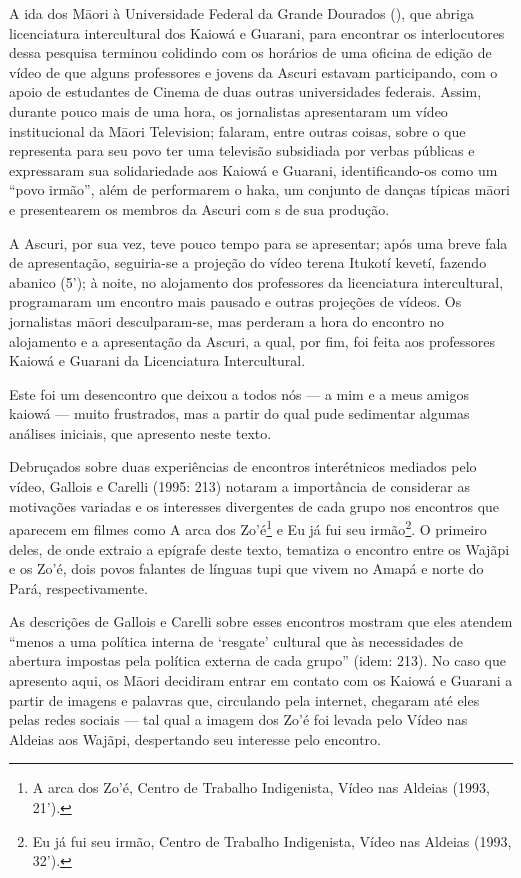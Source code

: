 A ida dos M\=aori à Universidade Federal da Grande Dourados (), que
abriga licenciatura intercultural dos Kaiowá e Guarani, para encontrar
os interlocutores dessa pesquisa terminou colidindo com os horários de
uma oficina de edição de vídeo de que alguns professores e jovens da
Ascuri estavam participando, com o apoio de estudantes de Cinema de
duas outras universidades federais. Assim, durante pouco mais de uma
hora, os jornalistas apresentaram um vídeo institucional da M\=aori
Television; falaram, entre outras coisas, sobre o que representa para
seu povo ter uma televisão subsidiada por verbas públicas e expressaram
sua solidariedade aos Kaiowá e Guarani, identificando-os como um ``povo
irmão'', além de performarem o haka, um conjunto de danças típicas
m\=aori e presentearem os membros da Ascuri com s de sua produção. 

A Ascuri, por sua vez, teve pouco tempo para se apresentar; após uma
breve fala de apresentação, seguiria-se a projeção do vídeo terena
Itukotí kevetí, fazendo abanico (5’); à noite, no alojamento dos
professores da licenciatura intercultural, programaram um encontro mais
pausado e outras projeções de vídeos. Os jornalistas m\=aori
desculparam-se, mas perderam a hora do encontro no alojamento e a
apresentação da Ascuri, a qual, por fim, foi feita aos professores
Kaiowá e Guarani da Licenciatura Intercultural. 

Este foi um desencontro que deixou a todos nós — a mim e a meus amigos
kaiowá — muito frustrados, mas a partir do qual pude sedimentar algumas
análises iniciais, que apresento neste texto. 

Debruçados sobre duas experiências de encontros interétnicos mediados
pelo vídeo, Gallois e Carelli (1995: 213) notaram a importância de
considerar as motivações variadas e os interesses divergentes de cada
grupo nos encontros que aparecem em filmes como A arca dos
Zo’é\footnote{A arca dos Zo’é, Centro de Trabalho Indigenista, Vídeo
nas Aldeias (1993, 21’).} e Eu já fui seu irmão\footnote{Eu já fui seu
irmão, Centro de Trabalho Indigenista, Vídeo nas Aldeias (1993, 32’).}.
O primeiro deles, de onde extraio a epígrafe deste texto, tematiza o
encontro entre os Wajãpi e os Zo’é, dois povos falantes de línguas tupi
que vivem no Amapá e norte do Pará, respectivamente.

As descrições de Gallois e Carelli sobre esses encontros mostram que
eles atendem ``menos a uma política interna de ‘resgate’ cultural que às
necessidades de abertura impostas pela política externa de cada grupo''
(idem: 213). No caso que apresento aqui, os M\=aori decidiram entrar em
contato com os Kaiowá e Guarani a partir de imagens e palavras que,
circulando pela internet, chegaram até eles pelas redes sociais — tal
qual a imagem dos Zo’é foi levada pelo Vídeo nas Aldeias aos Wajãpi,
despertando seu interesse pelo encontro.

